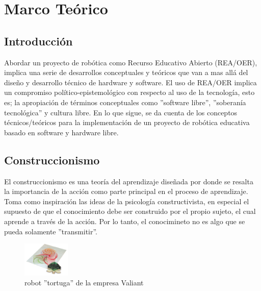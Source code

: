 
\chapter{Marco Teórico}

\section{Introducción}

Abordar un proyecto de robótica como Recurso Educativo Abierto (REA/OER), implica una serie de desarrollos conceptuales y teóricos que van a mas allá del diseño y desarrollo técnico de hardware y software. El uso de REA/OER \citep{montoya2012recursos} implica un compromiso político-epistemológico con respecto al uso de la tecnología, esto es; la apropiación de términos conceptuales como ''software libre'', ''soberanía tecnológica'' y cultura libre. En lo que sigue, se da cuenta de los conceptos técnicos/teóricos para  la implementación de un proyecto de robótica educativa basado en software y hardware libre.

\section{Construccionismo}

El construccionismo es una teoría del aprendizaje diseñada por \cite{seymour_papert_desafio_1987} donde se resalta la importancia de la acción como parte principal en el proceso de aprendizaje. Toma como inspiración las ideas de la psicología constructivista, en especial el supuesto de que el conocimiento debe ser construido por el propio sujeto, el cual aprende a través de la acción. Por lo tanto, el conocimineto no es algo que se pueda solamente ''transmitir''.

\begin{figure}
  \begin{center}
    \includegraphics[width=0.2\textwidth]{figuras/Turtle_draw.jpg}
    \caption[Caption for LOF]{robot ''tortuga'' de la empresa Valiant}
    
    \label{fig:turtle }
  \end{center}
\end{figure}


